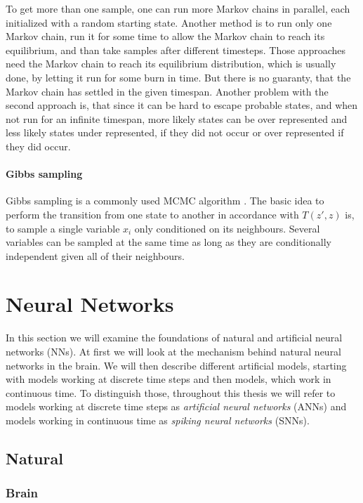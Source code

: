 To get more than one sample, one can run more Markov chains in parallel, each initialized with a random starting state. 
Another method is to run only one Markov chain, run it for some time to allow the Markov chain to reach its equilibrium, and than take samples after different timesteps.
Those approaches need the Markov chain to reach its equilibrium distribution, which is usually done, by letting it run for some burn in time.
But there is no guaranty, that the Markov chain has settled in the given timespan.    
Another problem with the second approach is, that since it can be hard to escape probable states, and when not run for an infinite timespan, more likely states can be over represented and less likely states under represented, if they did not occur or over represented if they did occur.  

\paragraph{Gibbs sampling} Gibbs sampling is a commonly used MCMC algorithm \cite{Goodfellow-et-al-2016-Book}. The basic idea to perform the transition from one state to another in accordance with $T(z',z)$ is, to sample a single variable $x_i$ only conditioned on its neighbours. 
Several variables can be sampled at the same time as long as they are conditionally independent given all of their neighbours.

\section{Neural Networks}

In this section we will examine the foundations of natural and artificial neural networks (NNs).
At first we will look at the mechanism behind natural neural networks in the brain.
We will then describe different artificial models, starting with models working at discrete time steps and then models, which work in continuous time.
To distinguish those, throughout this thesis we will refer to models working at discrete time steps as \textit{artificial neural networks} (ANNs) and models working in continuous time as \textit{spiking neural networks} (SNNs).

\subsection{Natural}
\subsubsection{Brain}

